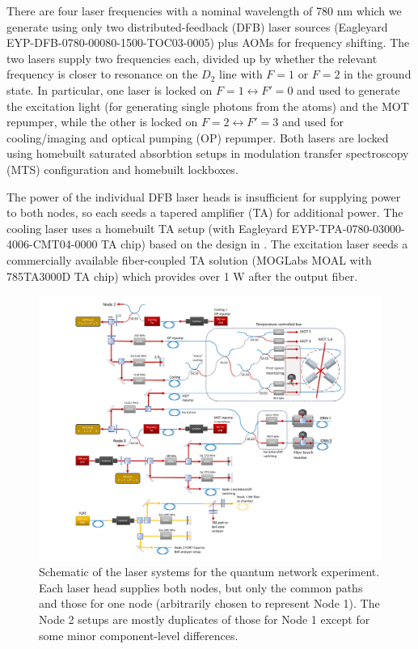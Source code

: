 There are four laser frequencies with a nominal wavelength of 780 nm which we generate using only two distributed-feedback (DFB) laser sources (Eagleyard EYP-DFB-0780-00080-1500-TOC03-0005) plus AOMs for frequency shifting. The two lasers supply two frequencies each, divided up by whether the relevant frequency is closer to resonance on the $D_2$ line with $F=1$ or $F=2$ in the ground state. In particular, one laser is locked on $F=1 \leftrightarrow F'=0$ and used to generate the excitation light (for generating single photons from the atoms) and the MOT repumper, while the other is locked on $F=2 \leftrightarrow F'=3$ and used for cooling/imaging and optical pumping (OP) repumper. Both lasers are locked using homebuilt saturated absorbtion setups in modulation transfer spectroscopy (MTS) configuration and homebuilt lockboxes.

The power of the individual DFB laser heads is insufficient for supplying power to both nodes, so each seeds a tapered amplifier (TA) for additional power. The cooling laser uses a homebuilt TA setup (with Eagleyard EYP-TPA-0780-03000-4006-CMT04-0000 TA chip) based on the design in \cite{kangara2014design}. The excitation laser seeds a commercially available fiber-coupled TA solution (MOGLabs MOAL with 785TA3000D TA chip) which provides over 1 W after the output fiber.

\begin{figure}[h!]
    \centering
    \includegraphics[width=\textwidth]{Images/quantum_network_laser_schematic.pdf}
    \caption{Schematic of the laser systems for the quantum network experiment. Each laser head supplies both nodes, but only the common paths and those for one node (arbitrarily chosen to represent Node 1). The Node 2 setups are mostly duplicates of those for Node 1 except for some minor component-level differences.}
    \label{fig:all_lasers_schematic}
\end{figure}

